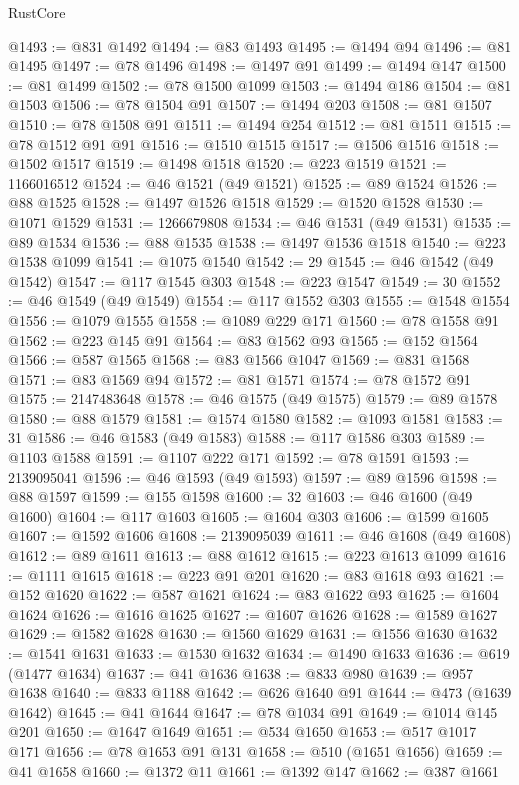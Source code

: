 \begin{lexlean}{RustCore}
\begin{coremodule}
@1493 := @831 @1492
@1494 := @83 @1493
@1495 := @1494 @94
@1496 := @81 @1495
@1497 := @78 @1496
@1498 := @1497 @91
@1499 := @1494 @147
@1500 := @81 @1499
@1502 := @78 @1500 @1099
@1503 := @1494 @186
@1504 := @81 @1503
@1506 := @78 @1504 @91
@1507 := @1494 @203
@1508 := @81 @1507
@1510 := @78 @1508 @91
@1511 := @1494 @254
@1512 := @81 @1511
@1515 := @78 @1512 @91 @91
@1516 := @1510 @1515
@1517 := @1506 @1516
@1518 := @1502 @1517
@1519 := @1498 @1518
@1520 := @223 @1519
@1521 := 1166016512
@1524 := @46 @1521 (@49 @1521)
@1525 := @89 @1524
@1526 := @88 @1525
@1528 := @1497 @1526 @1518
@1529 := @1520 @1528
@1530 := @1071 @1529
@1531 := 1266679808
@1534 := @46 @1531 (@49 @1531)
@1535 := @89 @1534
@1536 := @88 @1535
@1538 := @1497 @1536 @1518
@1540 := @223 @1538 @1099
@1541 := @1075 @1540
@1542 := 29
@1545 := @46 @1542 (@49 @1542)
@1547 := @117 @1545 @303
@1548 := @223 @1547
@1549 := 30
@1552 := @46 @1549 (@49 @1549)
@1554 := @117 @1552 @303
@1555 := @1548 @1554
@1556 := @1079 @1555
@1558 := @1089 @229 @171
@1560 := @78 @1558 @91
@1562 := @223 @145 @91
@1564 := @83 @1562 @93
@1565 := @152 @1564
@1566 := @587 @1565
@1568 := @83 @1566 @1047
@1569 := @831 @1568
@1571 := @83 @1569 @94
@1572 := @81 @1571
@1574 := @78 @1572 @91
@1575 := 2147483648
@1578 := @46 @1575 (@49 @1575)
@1579 := @89 @1578
@1580 := @88 @1579
@1581 := @1574 @1580
@1582 := @1093 @1581
@1583 := 31
@1586 := @46 @1583 (@49 @1583)
@1588 := @117 @1586 @303
@1589 := @1103 @1588
@1591 := @1107 @222 @171
@1592 := @78 @1591
@1593 := 2139095041
@1596 := @46 @1593 (@49 @1593)
@1597 := @89 @1596
@1598 := @88 @1597
@1599 := @155 @1598
@1600 := 32
@1603 := @46 @1600 (@49 @1600)
@1604 := @117 @1603
@1605 := @1604 @303
@1606 := @1599 @1605
@1607 := @1592 @1606
@1608 := 2139095039
@1611 := @46 @1608 (@49 @1608)
@1612 := @89 @1611
@1613 := @88 @1612
@1615 := @223 @1613 @1099
@1616 := @1111 @1615
@1618 := @223 @91 @201
@1620 := @83 @1618 @93
@1621 := @152 @1620
@1622 := @587 @1621
@1624 := @83 @1622 @93
@1625 := @1604 @1624
@1626 := @1616 @1625
@1627 := @1607 @1626
@1628 := @1589 @1627
@1629 := @1582 @1628
@1630 := @1560 @1629
@1631 := @1556 @1630
@1632 := @1541 @1631
@1633 := @1530 @1632
@1634 := @1490 @1633
@1636 := @619 (@1477 @1634)
@1637 := @41 @1636
@1638 := @833 @980
@1639 := @957 @1638
@1640 := @833 @1188
@1642 := @626 @1640 @91
@1644 := @473 (@1639 @1642)
@1645 := @41 @1644
@1647 := @78 @1034 @91
@1649 := @1014 @145 @201
@1650 := @1647 @1649
@1651 := @534 @1650
@1653 := @517 @1017 @171
@1656 := @78 @1653 @91 @131
@1658 := @510 (@1651 @1656)
@1659 := @41 @1658
@1660 := @1372 @11
@1661 := @1392 @147
@1662 := @387 @1661

\end{coremodule}
\end{lexlean}
